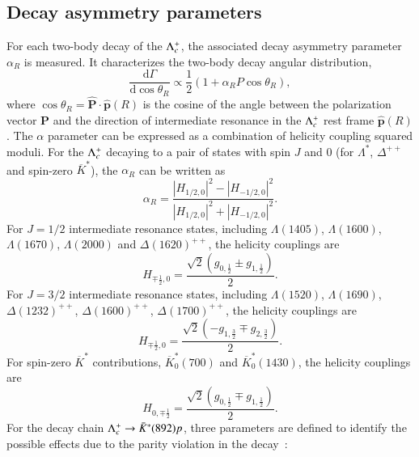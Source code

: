 \subsection{Decay asymmetry parameters}
\label{sec:decay_asymmetry}
For each two-body decay of the $\Lambda_{c}^{+}$, the associated decay asymmetry parameter $\alpha_R$ is measured. It characterizes the two-body decay angular distribution,
\begin{equation}
    \frac{\mathrm{d}\Gamma}{\mathrm{d}\cos\theta_R} \varpropto \frac{1}{2}(1+\alpha_R P \cos\theta_R),
\end{equation}
where $\cos\theta_R = \hat{\boldsymbol{P}} \cdot \hat{\boldsymbol{p}}(R)$ is the cosine of the angle between the polarization vector $\boldsymbol{P}$ and the direction of intermediate resonance in the $\Lambda_{c}^{+}$ rest frame $\hat{\boldsymbol{p}}(R)$. The $\alpha$ parameter can be expressed as a combination of helicity coupling squared moduli. For the $\Lambda_{c}^{+}$ decaying to a pair of states with spin $J$ and 0 (for $\Lambda^*$, $\Delta^{++}$ and spin-zero $\overline{K}^*$), the $\alpha_R$ can be written as
\begin{equation}
    \alpha_R = \frac{|H_{1/2,0}|^2 - |H_{-1/2,0}|^2}{|H_{1/2,0}|^2 + |H_{-1/2,0}|^2}.
\end{equation}
For $J = 1/2$ intermediate resonance states, including $\Lambda(1405)$, $\Lambda(1600)$, $\Lambda(1670)$, $\Lambda(2000)$ and $\Delta(1620)^{++}$, the helicity couplings are
\begin{equation}
    H_{ \mp\frac{1}{2}, 0 } = \frac{\sqrt{2} \left(g_{0,\frac{1}{2}} \pm g_{1,\frac{1}{2}}\right)}{2}.
\end{equation}
For $J = 3/2$ intermediate resonance states, including $\Lambda(1520)$, $\Lambda(1690)$, $\Delta(1232)^{++}$, $\Delta(1600)^{++}$, $\Delta(1700)^{++}$, the helicity couplings are
\begin{equation}
    H_{ \mp\frac{1}{2}, 0 } = \frac{\sqrt{2} \left(- g_{1,\frac{3}{2}} \mp g_{2,\frac{3}{2}}\right)}{2}.
\end{equation}
For spin-zero $\overline{K}^*$ contributions, $\overline{K}^*_0(700)$ and $\overline{K}^*_0(1430)$, the helicity couplings are
\begin{equation}
    H_{ 0, \mp\frac{1}{2} } = \frac{\sqrt{2} \left(g_{0,\frac{1}{2}} \mp g_{1,\frac{1}{2}}\right)}{2}.
\end{equation}
For the decay chain $\Lambda_{c}^{+} \rightarrow \bar{K}^*(892)p$, three parameters are defined to identify the possible effects due to the parity violation in the decay~\cite{Hong:2022prk}:
